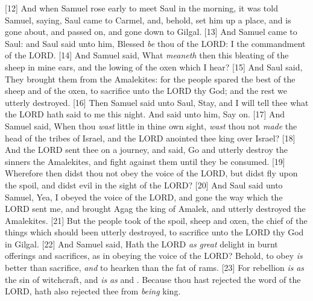 [12] \textcolor[cmyk]{0.99998,1,0,0}{And when Samuel rose early to meet Saul in the morning, it was told Samuel, saying, Saul came to Carmel, and, behold,  set him up a place, and is gone about, and passed on, and gone down to Gilgal.}
[13] \textcolor[cmyk]{0.99998,1,0,0}{And Samuel came to Saul: and Saul said unto him, Blessed \emph{be} thou of the LORD: I  the commandment of the LORD.}
[14] \textcolor[cmyk]{0.99998,1,0,0}{And Samuel said, What \emph{meaneth} then this bleating of the sheep in mine ears, and the lowing of the oxen which I hear?}
[15] \textcolor[cmyk]{0.99998,1,0,0}{And Saul said, They   brought them from the Amalekites: for the people spared the best of the sheep and of the oxen, to sacrifice unto the LORD thy God; and the rest we   utterly destroyed.}
[16] \textcolor[cmyk]{0.99998,1,0,0}{Then Samuel said unto Saul, Stay, and I will tell thee what the LORD hath said to me this night. And  said unto him, Say on.}
[17] \textcolor[cmyk]{0.99998,1,0,0}{And Samuel said, When thou \emph{wast} little in thine own sight, \emph{wast} thou not \emph{made} the head of the tribes of Israel, and the LORD anointed thee king over Israel?}
[18] \textcolor[cmyk]{0.99998,1,0,0}{And the LORD sent thee on a journey, and said, Go and utterly destroy the sinners the Amalekites, and fight against them until they be consumed.}
[19] \textcolor[cmyk]{0.99998,1,0,0}{Wherefore then didst thou not obey the voice of the LORD, but didst fly upon the spoil, and didst evil in the sight of the LORD?}
[20] \textcolor[cmyk]{0.99998,1,0,0}{And Saul said unto Samuel, Yea, I   obeyed the voice of the LORD, and   gone the way which the LORD sent me, and   brought Agag the king of Amalek, and   utterly destroyed the Amalekites.}
[21] \textcolor[cmyk]{0.99998,1,0,0}{But the people took of the spoil, sheep and oxen, the chief of the things which should   been utterly destroyed, to sacrifice unto the LORD thy God in Gilgal.}
[22] \textcolor[cmyk]{0.99998,1,0,0}{And Samuel said, Hath the LORD \emph{as} \emph{great} delight in burnt offerings and sacrifices, as in obeying the voice of the LORD? Behold, to obey \emph{is} better than sacrifice, \emph{and} to hearken than the fat of rams.}
[23] \textcolor[cmyk]{0.99998,1,0,0}{For rebellion \emph{is} \emph{as} the sin of witchcraft, and  \emph{is} \emph{as}  and . Because thou hast rejected the word of the LORD,  hath also rejected thee from \emph{being} king.}\\
